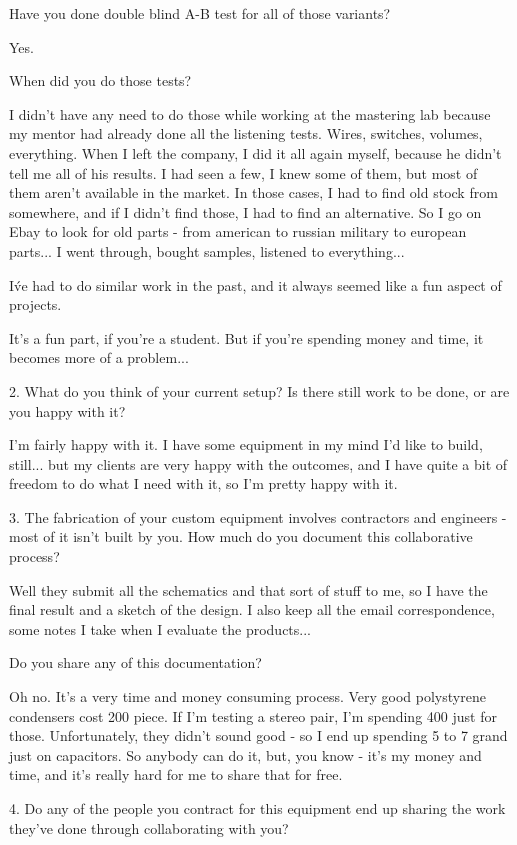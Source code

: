 Have you done double blind A-B test for all of those variants?

Yes.

When did you do those tests?

I didn't have any need to do those while working at the mastering lab because my mentor had already done all the listening tests. Wires, switches, volumes, everything. When I left the company, I did it all again myself, because he didn't tell me all of his results. I had seen a few, I knew some of them, but most of them aren't available in the market. In those cases, I had to find old stock from somewhere, and if I didn't find those, I had to find an alternative. So I go on Ebay to look for old parts - from american to russian military to european parts... I went through, bought samples, listened to everything...

I\'ve had to do similar work in the past, and it always seemed like a fun aspect of projects.

It's a fun part, if you're a student. But if you're spending money and time, it becomes more of a problem...

2. What do you think of your current setup? Is there still work to be done, or are you happy with it?

I'm fairly happy with it. I have some equipment in my mind I'd like to build, still... but my clients are very happy with the outcomes, and I have quite a bit of freedom to do what I need with it, so I'm pretty happy with it.

3. The fabrication of your custom equipment involves contractors and engineers - most of it isn't built by you. How much do you document this collaborative process?

Well they submit all the schematics and that sort of stuff to me, so I have the final result and a sketch of the design. I also keep all the email correspondence, some notes I take when I evaluate the products...

Do you share any of this documentation?

Oh no. It's a very time and money consuming process. Very good polystyrene condensers cost 200 piece. If I'm testing a stereo pair, I'm spending 400 just for those. Unfortunately, they didn't sound good - so I end up spending 5 to 7 grand just on capacitors. So anybody can do it, but, you know - it's my money and time, and it's really hard for me to share that for free.

4. Do any of the people you contract for this equipment end up sharing the work they've done through collaborating with you?


